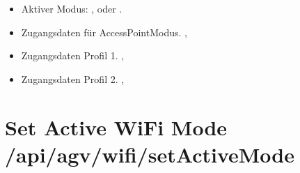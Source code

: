\documentclass[letterpaper,10pt,english]{sphinxmanual}
\begin{document}
\sphinxAtStartPar
{}
\begin{itemize}
\item {} 
\sphinxAtStartPar
{}  \textendash{} Aktiver Modus: ,  oder .

\item {} 
\sphinxAtStartPar
{}  \textendash{} Zugangsdaten für Access\sphinxhyphen{}Point\sphinxhyphen{}Modus.
\sphinxhyphen{}  ,  

\item {} 
\sphinxAtStartPar
{}  \textendash{} Zugangsdaten Profil 1.
\sphinxhyphen{}  ,  

\item {} 
\sphinxAtStartPar
{}  \textendash{} Zugangsdaten Profil 2.
\sphinxhyphen{}  ,  

\end{itemize}


\section{Set Active WiFi Mode \textendash{} /api/agv/wifi/setActiveMode}
\label{\detokenize{agv_rest_api_wifi:set-active-wifi-mode-api-agv-wifi-setactivemode}}\label{\detokenize{agv_rest_api_wifi:post-api-agv-wifi-setactivemode}}
\end{document}
